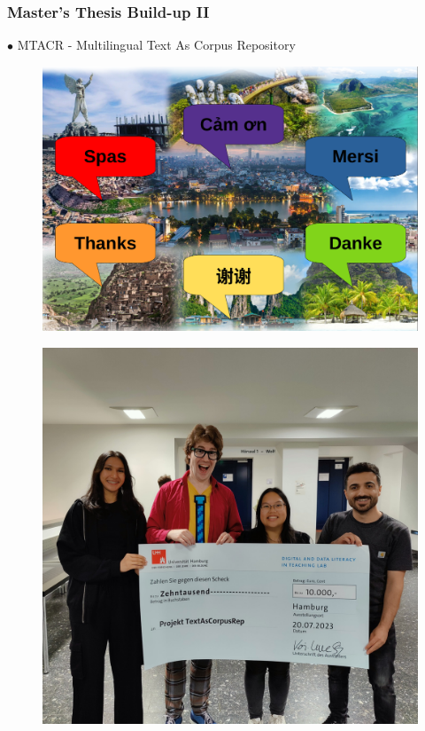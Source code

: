 \documentclass[aspectratio=169]{beamer}
\begin{document}
\begin{frame}[fragile]
	\frametitle{Master's Thesis Build-up II}
    \begin{minipage}{1.0\textwidth}
    \centering
    {\color{thiscolor}$\bullet$} MTACR - Multilingual Text As Corpus Repository
    \end{minipage}

    \begin{minipage}{.58\textwidth}
        \begin{figure}
            \centering
            \includegraphics[width=1.0\textwidth]{images/title-banner.png}
        \end{figure}%
        \end{minipage}
        \begin{minipage}{.4\textwidth}
            \centering
            \begin{figure}
                \centering
                \includegraphics[width=1.0\textwidth]{images/proj-2023-ddlitlab-TextAsCorpusRep.jpg}

\end{figure}
\end{minipage}
\end{frame}
\end{document}
